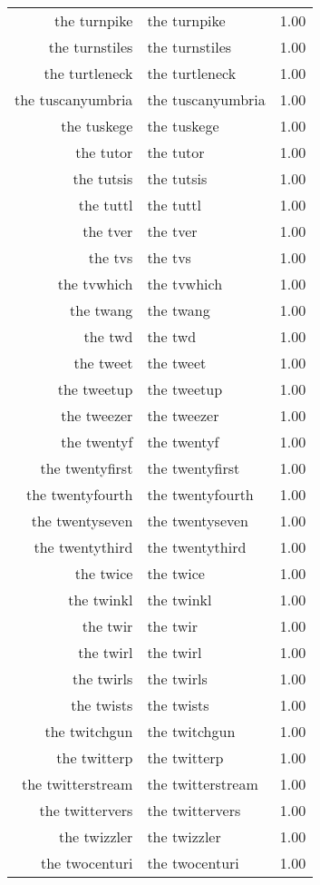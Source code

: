 \begin{table}[ht]
\begin{tabular}{rlr}
  the turnpike & the turnpike & 1.00 \\ 
  the turnstiles & the turnstiles & 1.00 \\ 
  the turtleneck & the turtleneck & 1.00 \\ 
  the tuscanyumbria & the tuscanyumbria & 1.00 \\ 
  the tuskege & the tuskege & 1.00 \\ 
  the tutor & the tutor & 1.00 \\ 
  the tutsis & the tutsis & 1.00 \\ 
  the tuttl & the tuttl & 1.00 \\ 
  the tver & the tver & 1.00 \\ 
  the tvs & the tvs & 1.00 \\ 
  the tvwhich & the tvwhich & 1.00 \\ 
  the twang & the twang & 1.00 \\ 
  the twd & the twd & 1.00 \\ 
  the tweet & the tweet & 1.00 \\ 
  the tweetup & the tweetup & 1.00 \\ 
  the tweezer & the tweezer & 1.00 \\ 
  the twentyf & the twentyf & 1.00 \\ 
  the twentyfirst & the twentyfirst & 1.00 \\ 
  the twentyfourth & the twentyfourth & 1.00 \\ 
  the twentyseven & the twentyseven & 1.00 \\ 
  the twentythird & the twentythird & 1.00 \\ 
  the twice & the twice & 1.00 \\ 
  the twinkl & the twinkl & 1.00 \\ 
  the twir & the twir & 1.00 \\ 
  the twirl & the twirl & 1.00 \\ 
  the twirls & the twirls & 1.00 \\ 
  the twists & the twists & 1.00 \\ 
  the twitchgun & the twitchgun & 1.00 \\ 
  the twitterp & the twitterp & 1.00 \\ 
  the twitterstream & the twitterstream & 1.00 \\ 
  the twittervers & the twittervers & 1.00 \\ 
  the twizzler & the twizzler & 1.00 \\ 
  the twocenturi & the twocenturi & 1.00 \\ 

\end{tabular}
\end{table}
